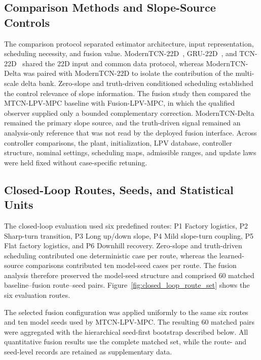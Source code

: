 \documentclass{ieeeaccess}
\newcommand{\citep}[1]{\cite{#1}}
\begin{document}
\subsection{Comparison Methods and Slope-Source Controls}

The comparison protocol separated estimator architecture, input representation, scheduling necessity, and fusion value. ModernTCN-22D~\citep{Luo2024ModernTCN}, GRU-22D~\citep{Cho2014GRU}, and TCN-22D~\citep{Bai2018TCN} shared the 22D input and common data protocol, whereas ModernTCN-Delta was paired with ModernTCN-22D to isolate the contribution of the multi-scale delta bank. Zero-slope and truth-driven conditioned scheduling established the control relevance of slope information. The fusion study then compared the MTCN-LPV-MPC baseline with Fusion-LPV-MPC, in which the qualified observer supplied only a bounded complementary correction. ModernTCN-Delta remained the primary slope source, and the truth-driven signal remained an analysis-only reference that was not read by the deployed fusion interface. Across controller comparisons, the plant, initialization, LPV database, controller structure, nominal settings, scheduling maps, admissible ranges, and update laws were held fixed without case-specific retuning.

\subsection{Closed-Loop Routes, Seeds, and Statistical Units}

The closed-loop evaluation used six predefined routes: P1 Factory logistics, P2 Sharp-turn transition, P3 Long up/down slope, P4 Mild slope-turn coupling, P5 Flat factory logistics, and P6 Downhill recovery. Zero-slope and truth-driven scheduling contributed one deterministic case per route, whereas the learned-source comparisons contributed ten model-seed cases per route. The fusion analysis therefore preserved the model-seed structure and comprised 60 matched baseline--fusion route--seed pairs. Figure~\ref{fig:closed_loop_route_set} shows the six evaluation routes.

The selected fusion configuration was applied uniformly to the same six routes and ten model seeds used by MTCN-LPV-MPC. The resulting 60 matched pairs were aggregated with the hierarchical seed-first bootstrap described below. All quantitative fusion results use the complete matched set, while the route- and seed-level records are retained as supplementary data.
\end{document}
